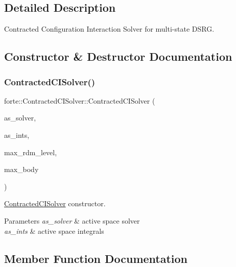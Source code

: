 \subsection{Detailed Description}
Contracted Configuration Interaction Solver for multi-\/state D\+S\+RG. 

\subsection{Constructor \& Destructor Documentation}
\mbox{\label{classforte_1_1_contracted_c_i_solver_a4503df709ead99d98a03f5b04f6feeaa}} 
\subsubsection{\texorpdfstring{Contracted\+C\+I\+Solver()}{ContractedCISolver()}}
{\footnotesize\ttfamily forte\+::\+Contracted\+C\+I\+Solver\+::\+Contracted\+C\+I\+Solver (\begin{DoxyParamCaption}\item[{std\+::shared\+\_\+ptr$<$ \mbox{\hyperlink{classforte_1_1_active_space_solver}{Active\+Space\+Solver}} $>$}]{as\+\_\+solver,  }\item[{std\+::shared\+\_\+ptr$<$ \mbox{\hyperlink{classforte_1_1_active_space_integrals}{Active\+Space\+Integrals}} $>$}]{as\+\_\+ints,  }\item[{int}]{max\+\_\+rdm\+\_\+level,  }\item[{int}]{max\+\_\+body }\end{DoxyParamCaption})}



\mbox{\hyperlink{classforte_1_1_contracted_c_i_solver}{Contracted\+C\+I\+Solver}} constructor. 


\begin{DoxyParams}{Parameters}
{\em as\+\_\+solver} & active space solver \\
\hline
{\em as\+\_\+ints} & active space integrals \\
\hline
\end{DoxyParams}


\subsection{Member Function Documentation}
\mbox{\label{classforte_1_1_contracted_c_i_solver_a048dbac796ce7a43a2e6021dbda14577}} 

